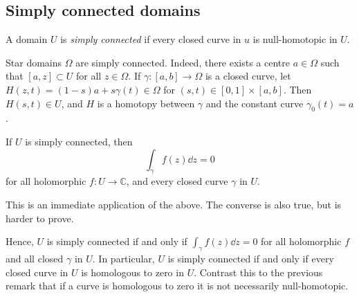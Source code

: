 \subsection{Simply connected domains}
\begin{definition}
	A domain \( U \) is \textit{simply connected} if every closed curve in \( u \) is null-homotopic in \( U \).
\end{definition}
Star domains \( \Omega \) are simply connected.
Indeed, there exists a centre \( a \in \Omega \) such that \( [a,z] \subset U \) for all \( z \in \Omega \).
If \( \gamma \colon [a,b] \to \Omega \) is a closed curve, let \( H(z,t) = (1-s)a + s\gamma(t) \in \Omega \) for \( (s,t) \in [0,1] \times [a,b] \).
Then \( H(s,t) \in U \), and \( H \) is a homotopy between \( \gamma \) and the constant curve \( \gamma_0(t) = a \).
\begin{theorem}
	If \( U \) is simply connected, then
	\[ \int_\gamma f(z) \dd{z} = 0 \]
	for all holomorphic \( f \colon U \to \mathbb C \), and every closed curve \( \gamma \) in \( U \).
\end{theorem}
This is an immediate application of the above.
The converse is also true, but is harder to prove.

Hence, \( U \) is simply connected if and only if \( \int_\gamma f(z) \dd{z} = 0 \) for all holomorphic \( f \) and all closed \( \gamma \) in \( U \).
In particular, \( U \) is simply connected if and only if every closed curve in \( U \) is homologous to zero in \( U \).
Contrast this to the previous remark that if a curve is homologous to zero it is not necessarily null-homotopic.
